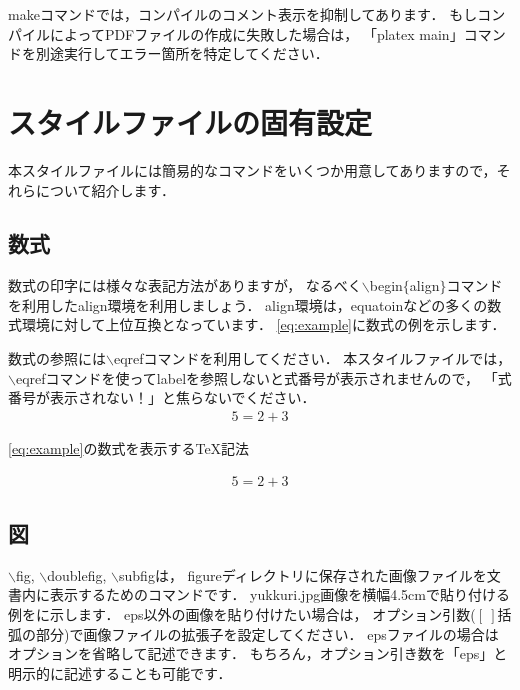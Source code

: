 makeコマンドでは，コンパイルのコメント表示を抑制してあります．
もしコンパイルによってPDFファイルの作成に失敗した場合は，
「platex main」コマンドを別途実行してエラー箇所を特定してください．
\section{スタイルファイルの固有設定}
\label{sec:master}
本スタイルファイルには簡易的なコマンドをいくつか用意してありますので，それらについて紹介します．

\subsection{数式}
数式の印字には様々な表記方法がありますが，
なるべく$\backslash$begin$\{$align$\}$コマンドを利用したalign環境を利用しましょう．
align環境は，equatoinなどの多くの数式環境に対して上位互換となっています．
\eqref{eq:example}に数式の例を示します．

数式の参照には$\backslash$eqrefコマンドを利用してください．
本スタイルファイルでは，
$\backslash$eqrefコマンドを使ってlabelを参照しないと式番号が表示されませんので，
「式番号が表示されない！」と焦らないでください．
%
\begin{align}
	5 = 2 + 3
	\label{eq:example}
\end{align}
%
\begin{lstbox}{\eqref{eq:example}の数式を表示するTeX記法}
\begin{minilst}
\begin{align}
	5 = 2 + 3
	\label{eq:1}
\end{align}
\end{minilst}
\end{lstbox}
\subsection{図}
$\backslash$fig, $\backslash$doublefig, $\backslash$subfigは，
figureディレクトリに保存された画像ファイルを文書内に表示するためのコマンドです．
yukkuri.jpg画像を横幅4.5cmで貼り付ける例をに示します．
eps以外の画像を貼り付けたい場合は，
オプション引数($[\ ]$括弧の部分)で画像ファイルの拡張子を設定してください．
epsファイルの場合はオプションを省略して記述できます．
もちろん，オプション引き数を「eps」と明示的に記述することも可能です．

